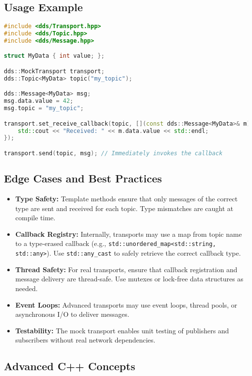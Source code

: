 \documentclass[12pt]{report}
\begin{document}
\subsection{Usage Example}
\begin{lstlisting}[language=C++]
#include <dds/Transport.hpp>
#include <dds/Topic.hpp>
#include <dds/Message.hpp>

struct MyData { int value; };

dds::MockTransport transport;
dds::Topic<MyData> topic("my_topic");

dds::Message<MyData> msg;
msg.data.value = 42;
msg.topic = "my_topic";

transport.set_receive_callback(topic, [](const dds::Message<MyData>& m) {
    std::cout << "Received: " << m.data.value << std::endl;
});

transport.send(topic, msg); // Immediately invokes the callback
\end{lstlisting}

\subsection{Edge Cases and Best Practices}
\begin{itemize}
    \item \textbf{Type Safety:} Template methods ensure that only messages of the correct type are sent and received for each topic. Type mismatches are caught at compile time.
    \item \textbf{Callback Registry:} Internally, transports may use a map from topic name to a type-erased callback (e.g., \texttt{std::unordered\_map<std::string, std::any>}). Use \texttt{std::any\_cast} to safely retrieve the correct callback type.
    \item \textbf{Thread Safety:} For real transports, ensure that callback registration and message delivery are thread-safe. Use mutexes or lock-free data structures as needed.
    \item \textbf{Event Loops:} Advanced transports may use event loops, thread pools, or asynchronous I/O to deliver messages.
    \item \textbf{Testability:} The mock transport enables unit testing of publishers and subscribers without real network dependencies.
\end{itemize}

\subsection{Advanced C++ Concepts}
\end{document}
